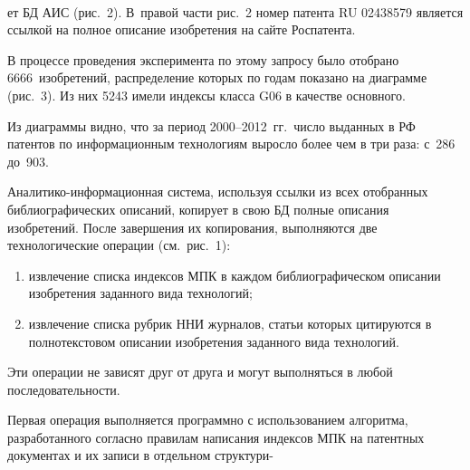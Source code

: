 \begin{figure*} %
\vspace*{1pt}
\begin{center}
\mbox{%
\epsfxsize=110.708mm
}
\end{center}
\vspace*{-9pt}
\end{figure*}

\begin{multicols}{2}

\noindent
ет БД АИС (рис.~2). В~правой час\-ти рис.~2 номер патента RU 02438579
является ссылкой на полное описание изобретения на сайте Роспатента.


     В процессе проведения эксперимента по этому запросу было отобрано 6666~изобретений, распределение которых
по годам показано на диаграмме (рис.~3). Из них 5243 имели индексы класса G06 в качестве основного.

     Из диаграммы видно, что за период 2000--2012~гг.\ число выданных в РФ патентов по информационным
технологиям выросло более чем в три раза: с~286 до~903.

     Аналитико-информационная сис\-те\-ма, используя ссылки из всех отобранных биб\-ли\-о\-гра\-фи\-че\-ских описаний, копирует в свою БД полные описания
изобретений. После завершения их копирования, выполняются две технологические операции (см.\ рис.~1):
     \begin{enumerate}[(1)]
\item извлечение списка индексов МПК в каждом библиографическом описании изобретения заданного вида технологий;
\item извлечение списка рубрик ННИ журналов, \mbox{статьи} которых цитируются в полнотекстовом описании изобретения заданного вида
технологий.
\end{enumerate}
     Эти операции не зависят друг от друга и могут выполняться в любой последовательности.



     Первая операция выполняется программно с использованием алгоритма, разработанного согласно правилам
написания индексов МПК на патентных документах и их записи в отдельном
структури-\linebreak\vspace*{-12pt}

\pagebreak

\end{multicols}

